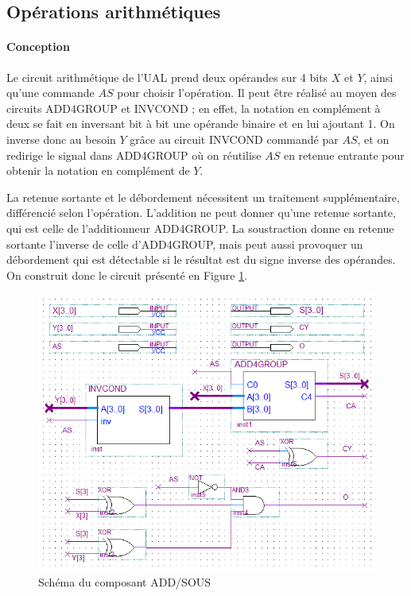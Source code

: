 \documentclass[a4paper,11pt]{article}
\begin{document}
\subsection*{Opérations arithmétiques}

\paragraph{Conception} Le circuit arithmétique de l'UAL prend deux opérandes sur 4 bits $X$ et $Y$, ainsi qu'une commande $AS$ pour choisir l'opération. Il peut être réalisé au moyen des circuits ADD4GROUP et INVCOND ; en effet, la notation en complément à deux se fait en inversant bit à bit une opérande binaire et en lui ajoutant 1. On inverse donc au besoin $Y$ grâce au circuit INVCOND commandé par $AS$, et on redirige le signal dans ADD4GROUP où on réutilise $AS$ en retenue entrante pour obtenir la notation en complément de $Y$.

La retenue sortante et le débordement nécessitent un traitement supplémentaire, différencié selon l'opération. L'addition ne peut donner qu'une retenue sortante, qui est celle de l'additionneur ADD4GROUP. La soustraction donne en retenue sortante l'inverse de celle d'ADD4GROUP, mais peut aussi provoquer un débordement qui est détectable si le résultat est du signe inverse des opérandes. On construit donc le circuit présenté en Figure \ref{addsous}.

\begin{figure}[h]
	\center
	\includegraphics[scale=0.75]{addsous.png}
	\caption{Schéma du composant ADD/SOUS}
	\label{addsous}
\end{figure}
\end{document}
